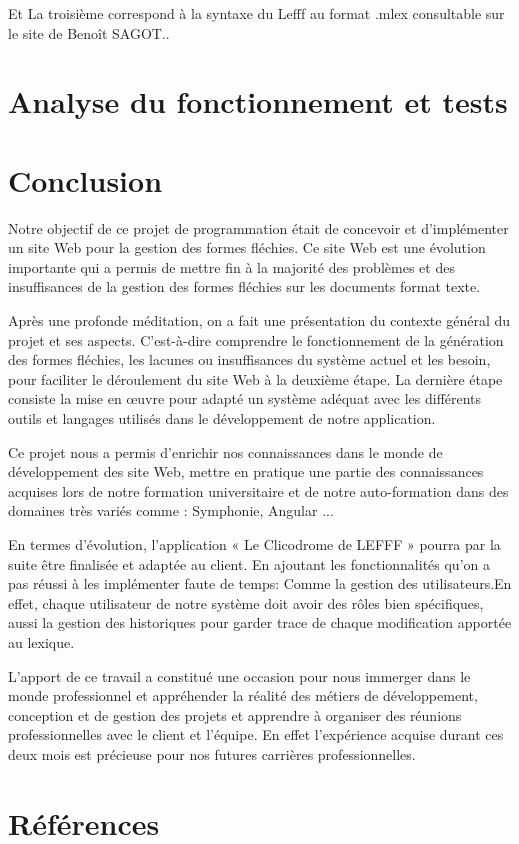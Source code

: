 \documentclass[12pt,a4paper]{article}
\begin{document}
Et La troisième  correspond à la syntaxe du Lefff au format .mlex consultable sur le site de Benoît SAGOT..

\section{Analyse du fonctionnement et tests}

\section{Conclusion}

Notre objectif de ce projet de programmation était de concevoir et d'implémenter un site Web pour la gestion des formes fléchies.
Ce site Web est une évolution importante qui a permis de mettre fin à la majorité des problèmes et des insuffisances de la gestion des formes fléchies sur les documents format texte. 


Après une profonde méditation, on a fait une présentation du contexte général du projet et ses aspects. C'est-à-dire comprendre le fonctionnement de la génération des formes fléchies, les lacunes ou insuffisances du système actuel et les besoin, pour faciliter le déroulement du site Web à la deuxième étape. 
La dernière étape consiste la mise en œuvre pour adapté un système
adéquat avec les différents outils et langages utilisés dans le développement de notre application.

Ce projet nous a permis d'enrichir nos connaissances dans le monde de développement des site Web, mettre en pratique une partie des connaissances acquises lors de notre formation universitaire et de notre auto-formation dans des domaines très variés comme :  Symphonie, Angular ...
 

En termes d'évolution, l'application « Le Clicodrome de LEFFF » pourra par la suite être finalisée et adaptée au client.
En ajoutant les fonctionnalités qu'on a pas réussi à les implémenter faute de temps: Comme la gestion des utilisateurs.En effet, chaque utilisateur de notre système doit avoir des rôles bien spécifiques, aussi la gestion des historiques pour garder trace de chaque modification apportée au lexique.

L'apport de ce travail a constitué une occasion pour nous immerger dans le monde professionnel et appréhender la réalité des métiers de développement, conception et de gestion des projets et apprendre à organiser des réunions professionnelles avec le client et l'équipe. En effet l'expérience acquise durant ces deux mois est précieuse pour nos futures carrières professionnelles.
\section{Références}


\end{document}
